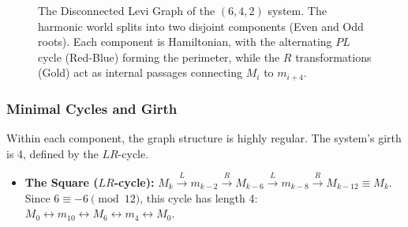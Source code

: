 \documentclass[12pt,letterpaper]{amsart}
\begin{document}
\begin{figure}[H]
    \caption{The Disconnected Levi Graph of the $(6,4,2)$ system. The harmonic world splits into two disjoint components (Even and Odd roots). Each component is Hamiltonian, with the alternating $PL$ cycle (Red-Blue) forming the perimeter, while the $R$ transformations (Gold) act as internal passages connecting $M_i$ to $m_{i+4}$.}
    \label{fig:tritone_disconnected}
\end{figure}
\subsubsection{Minimal Cycles and Girth}
Within each component, the graph structure is highly regular. The system's girth is 4, defined by the $LR$-cycle.

\begin{itemize}
    \item \textbf{The Square ($LR$-cycle):} $M_k \xrightarrow{L} m_{k-2} \xrightarrow{R} M_{k-6} \xrightarrow{L} m_{k-8} \xrightarrow{R} M_{k-12} \equiv M_k$.
    Since $6 \equiv -6 \pmod{12}$, this cycle has length 4: $M_0 \leftrightarrow m_{10} \leftrightarrow M_6 \leftrightarrow m_4 \leftrightarrow M_0$.
 \end{itemize}
\end{document}
